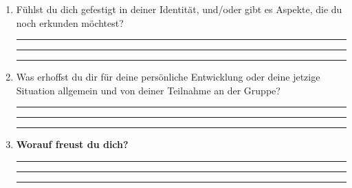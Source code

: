 \documentclass[a4paper,12pt]{article}
\begin{document}
\begin{enumerate}[label=--]
    \rule{12cm}{0.2pt}

    \rule{12cm}{0.2pt}
    
    \rule{12cm}{0.2pt}
    
    \item Fühlst du dich gefestigt in deiner Identität, und/oder gibt es Aspekte, die du noch erkunden möchtest?  
    
    \rule{12cm}{0.2pt}
    
    \rule{12cm}{0.2pt}
    
    \rule{12cm}{0.2pt}
    
    \item Was erhoffst du dir für deine persönliche Entwicklung oder deine jetzige Situation allgemein und von deiner Teilnahme an der Gruppe?  
   
    \rule{12cm}{0.2pt}
    
    \rule{12cm}{0.2pt}
    
    \rule{12cm}{0.2pt}
    
    \item \textbf{Worauf freust du dich?}  
   
    \rule{12cm}{0.2pt}

    \rule{12cm}{0.2pt}
    
    \rule{12cm}{0.2pt}
\end{enumerate}
\end{document}
